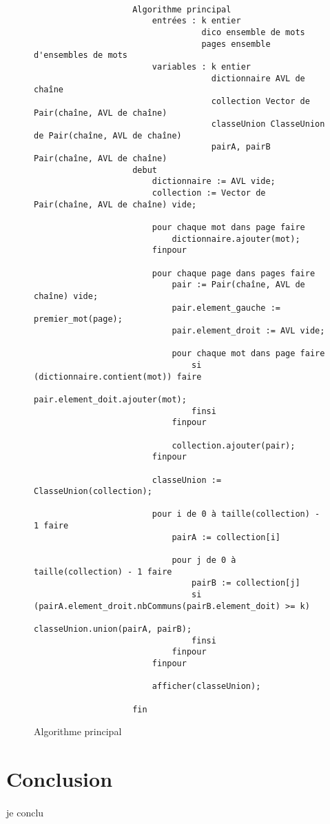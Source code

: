 \documentclass[a4paper]{article}
\begin{document}
			\paragraph{}{
    			\begin{figure}
    	    	    \begin{verbatim}
    	    	    Algorithme principal
    	    	        entrées : k entier
    	    	                  dico ensemble de mots
    	    	                  pages ensemble d'ensembles de mots
    	    	        variables : k entier
    	    	                    dictionnaire AVL de chaîne
    	    	                    collection Vector de Pair(chaîne, AVL de chaîne)
    	    	                    classeUnion ClasseUnion de Pair(chaîne, AVL de chaîne)
    	    	                    pairA, pairB Pair(chaîne, AVL de chaîne)
    	    	    debut
    	    	        dictionnaire := AVL vide;
    	    	        collection := Vector de Pair(chaîne, AVL de chaîne) vide;
    	    	        
    	    	        pour chaque mot dans page faire
    	    	            dictionnaire.ajouter(mot);
    	    	        finpour
    	    	            
    	    	        pour chaque page dans pages faire
    	    	            pair := Pair(chaîne, AVL de chaîne) vide;
    	    	            pair.element_gauche := premier_mot(page);
    	    	            pair.element_droit := AVL vide;
    	    	            
    	    	            pour chaque mot dans page faire
    	    	                si (dictionnaire.contient(mot)) faire
    	    	                    pair.element_doit.ajouter(mot);
    	    	                finsi
    	    	            finpour
    	    	            
    	    	            collection.ajouter(pair);
    	    	        finpour
    	    	        
    	    	        classeUnion := ClasseUnion(collection);
    	    	        
    	    	        pour i de 0 à taille(collection) - 1 faire
    	    	            pairA := collection[i]
    	    	            
    	    	            pour j de 0 à taille(collection) - 1 faire
    	    	                pairB := collection[j]
    	    	                si (pairA.element_droit.nbCommuns(pairB.element_doit) >= k)
    	    	                    classeUnion.union(pairA, pairB);
    	    	                finsi
    	    	            finpour
    	    	        finpour
    	    	        
    	    	        afficher(classeUnion);
    	    	        
    	    	    fin
    	    	    \end{verbatim}
    	    	\caption{Algorithme principal \label{algo_main}}
    	    	\end{figure}
	    	}	
			
	\section*{Conclusion}
		\paragraph{}{je conclu}
		
\end{document}
